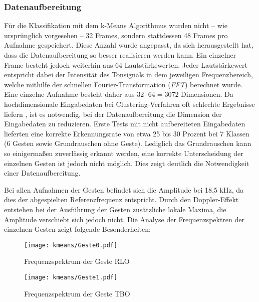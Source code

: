 \subsubsection{Datenaufbereitung}\label{subsubsec:Datenaufbereitung}
Für die Klassifikation mit dem k-Means Algorithmus wurden nicht -- wie ursprünglich vorgesehen -- 32 Frames, sondern stattdessen 48 Frames pro Aufnahme gespeichert.  Diese Anzahl wurde angepasst, da sich herausgestellt hat, dass die Datenaufbereitung so besser realisieren werden kann.  Ein einzelner Frame besteht jedoch weiterhin aus 64 Lautstärkewerten.
Jeder Lautstärkewert entspricht dabei der Intensität des Tonsignals in dem jeweiligen Frequenzbereich, welche mithilfe der schnellen Fourier-Transformation (\emph{FFT}) \cite{fftMathebuch} berechnet wurde. Eine einzelne Aufnahme besteht daher aus $32 \cdot 64 = 3072$ Dimensionen.  Da hochdimensionale Eingabedaten bei Clustering-Verfahren oft schlechte Ergebnisse liefern \cite{kMeansHighDimensions}, ist es notwendig, bei der Datenaufbereitung die Dimension der Eingabedaten zu reduzieren.  Erste Tests mit nicht aufbereiteten 
Eingabedaten lieferten eine korrekte Erkennungsrate von etwa 25 bis 30 Prozent bei 7 Klassen (6 Gesten sowie Grundrauschen ohne Geste). Lediglich das Grundrauschen kann so einigermaßen zuverlässig erkannt werden, eine korrekte Unterscheidung der einzelnen Gesten ist jedoch nicht möglich. Dies zeigt deutlich die Notwendigkeit einer Datenaufbereitung.

Bei allen Aufnahmen der Gesten befindet sich die Amplitude bei 18,5 kHz, da dies der abgespielten Referenzfrequenz entspricht. Durch den Doppler-Effekt entstehen bei der Ausführung der Gesten zusätzliche lokale Maxima, die Amplitude verschiebt sich jedoch nicht.
Die Analyse der Frequenzspektren der einzelnen Gesten zeigt folgende Besonderheiten:

\begin{figure*}[htbp]
    \centering
   \texttt{[image: kmeans/Geste0.pdf]}
\caption{Frequenzspektrum der Geste \ac{RLO}}
\label{fig:kMeansGeste0}
\end{figure*}

\begin{figure*}[htbp]
    \centering
   \texttt{[image: kmeans/Geste1.pdf]}
\caption{Frequenzspektrum der Geste \ac{TBO}}
\label{fig:kMeansGeste1}
\end{figure*}

